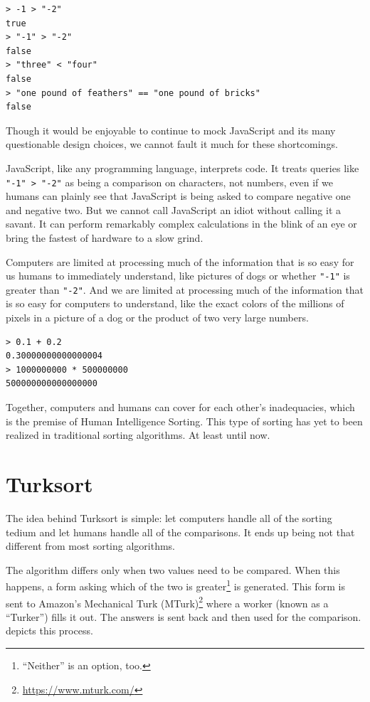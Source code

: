 \documentclass{article}
\begin{document}
\begin{lstlisting}[caption = Comparisons in JavaScript (Node.js 12.12.0)]
> -1 > "-2"
true
> "-1" > "-2"
false
> "three" < "four"
false
> "one pound of feathers" == "one pound of bricks"
false
\end{lstlisting}

Though it would be enjoyable to continue to mock JavaScript and its many
questionable design choices, we cannot fault it much for these shortcomings.

JavaScript, like any programming language, interprets code. It treats queries
like \texttt{"-1" > "-2"} as being a comparison on characters, not numbers, even
if we humans can plainly see that JavaScript is being asked to compare negative
one and negative two. But we cannot call JavaScript an idiot without calling it
a savant. It can perform remarkably complex calculations in the blink of an eye
or bring the fastest of hardware to a slow grind.

Computers are limited at processing much of the information that is so easy for
us humans to immediately understand, like pictures of dogs or whether
\texttt{"-1"} is greater than \texttt{"-2"}. And we are limited at processing
much of the information that is so easy for computers to understand, like the
exact colors of the millions of pixels in a picture of a dog or the product of
two very large numbers.

\begin{lstlisting}[caption = Complex Operations in JavaScript (Node.js 12.12.0)]
> 0.1 + 0.2
0.30000000000000004
> 1000000000 * 500000000
500000000000000000
\end{lstlisting}

Together, computers and humans can cover for each other's inadequacies, which is
the premise of Human Intelligence Sorting. This type of sorting has yet to been
realized in traditional sorting algorithms. At least until now.

\section{Turksort}

The idea behind Turksort is simple: let computers handle all of the sorting
tedium and let humans handle all of the comparisons. It ends up being not that
different from most sorting algorithms.

The algorithm differs only when two values need to be compared. When this
happens, a form asking which of the two is greater\footnote{``Neither'' is an
  option, too.} is generated. This form is sent to Amazon's Mechanical
Turk (MTurk)\footnote{\url{https://www.mturk.com/}} where a worker (known as a
``Turker'') fills it out. The answers is sent back and then used for the
comparison.  depicts this process.
\end{document}

